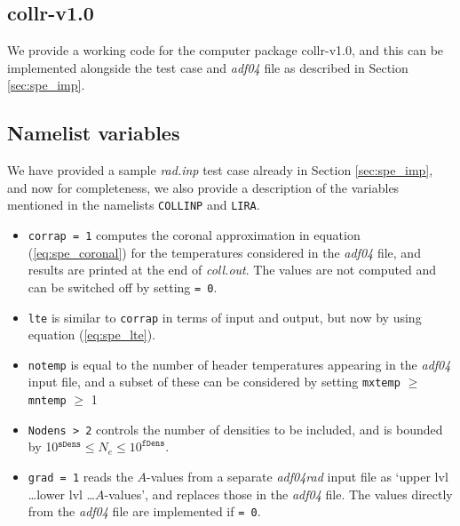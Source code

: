 
\begin{appendices}
\chapter{{\sc collr-v1.0}} %

\label{app:radt} %


We provide a working code for the computer package {\sc collr-v1.0}, and this can be implemented alongside the test case and \textit{adf04} file as described in Section \ref{sec:spe_imp}. 

\section*{Namelist variables}
We have provided a sample \textit{rad.inp} test case already in Section \ref{sec:spe_imp}, and now for completeness, we also provide a description of the variables mentioned in the namelists \texttt{COLLINP} and \texttt{LIRA}.

\begin{itemize}
\item{\texttt{corrap = 1} computes the coronal approximation in equation (\ref{eq:spe_coronal}) for the temperatures considered in the \textit{adf04} file, and results are printed at the end of \textit{coll.out}. The values are not computed and can be switched off by setting \texttt{= 0}.}

\item{\texttt{lte} is similar to \texttt{corrap} in terms of input and output, but now by using equation (\ref{eq:spe_lte}).}

\item{\texttt{notemp} is equal to the number of header temperatures appearing in the \textit{adf04} input file, and a subset of these can be considered by setting \texttt{mxtemp} $\geq$ \texttt{mntemp} $\geq$ 1}

\item{\texttt{Nodens > 2} controls the number of densities to be included, and is bounded by 10$^{\texttt{sDens}} \leq N_e \leq 10^{\texttt{fDens}}$.}

\item{\texttt{grad = 1} reads the $A$-values from a separate \textit{adf04rad} input file as `upper lvl  \dots lower lvl \dots $A$-values', and replaces those in the \textit{adf04} file. The values directly from the \textit{adf04} file are implemented if \texttt{= 0}.}


\end{itemize}
\end{appendices}
